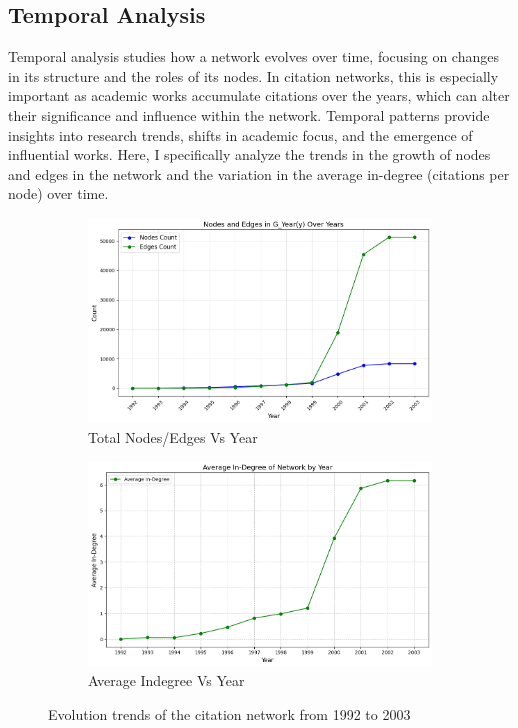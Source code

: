 \documentclass{article}
\begin{document}
\subsection{Temporal Analysis}
Temporal analysis studies how a network evolves over time, focusing on changes in its structure and the roles of its nodes. In citation networks, this is especially important as academic works accumulate citations over the years, which can alter their significance and influence within the network. Temporal patterns provide insights into research trends, shifts in academic focus, and the emergence of influential works. Here, I specifically analyze the trends in the growth of nodes and edges in the network and the variation in the average in-degree (citations per node) over time.

\begin{figure}[h]
\centering
\begin{subfigure}[b]{0.48\textwidth}
    \centering
    \includegraphics[width=\textwidth]{Figures/Trend change.png}
    \caption{Total Nodes/Edges Vs Year}
    \label{fig:network_graph}
\end{subfigure}
\hfill
\begin{subfigure}[b]{0.48\textwidth}
    \centering
    \includegraphics[width=\textwidth]{Figures/CItation Aging.png}
    \caption{Average Indegree Vs Year}
    \label{fig:sample_network}
\end{subfigure}
\caption{Evolution trends of the citation network from 1992 to 2003}
\label{fig:combined}
\end{figure}
\end{document}
